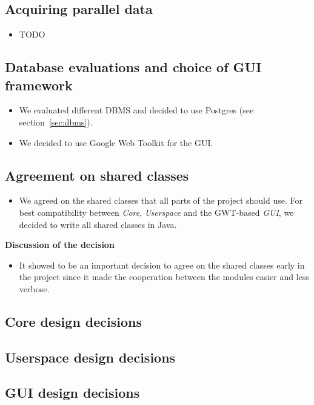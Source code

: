 \subsection{Acquiring parallel data}

\begin{itemize}
	\item TODO
\end{itemize}


\subsection{Database evaluations and choice of GUI framework}

\begin{itemize}
	\item We evaluated different DBMS and decided to use Postgres (see section~\ref{sec:dbms}).
	\item We decided to use Google Web Toolkit for the GUI.

\end{itemize}


\subsection{Agreement on shared classes}

\begin{itemize}
	\item We agreed on the shared classes that all parts of the project should use. For best compatibility between  \emph{Core}, \emph{Userspace} and the GWT-based \emph{GUI}, we decided to write all shared classes in Java.
\end{itemize}


\noindent\textbf{Discussion of the decision}

\begin{itemize}
	\item It showed to be an important decision to agree on the shared classes early in the project since it made the cooperation between the modules easier and less verbose.
\end{itemize}


\subsection{Core design decisions}



\subsection{Userspace design decisions}



\subsection{GUI design decisions}




